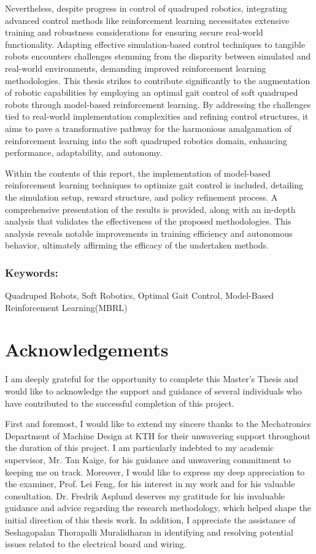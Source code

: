 Nevertheless, despite progress in control of quadruped robotics, integrating advanced control methods like reinforcement learning necessitates extensive training and robustness considerations for ensuring secure real-world functionality. Adapting effective simulation-based control techniques to tangible robots encounters challenges stemming from the disparity between simulated and real-world environments, demanding improved reinforcement learning methodologies. This thesis strikes to contribute significantly to the augmentation of robotic capabilities by employing an optimal gait control of soft quadruped robots through model-based reinforcement learning. By addressing the challenges tied to real-world implementation complexities and refining control structures, it aims to pave a transformative pathway for the harmonious amalgamation of reinforcement learning into the soft quadruped robotics domain, enhancing performance, adaptability, and autonomy.

Within the contents of this report, the implementation of model-based reinforcement learning techniques to optimize gait control is included, detailing the simulation setup, reward structure, and policy refinement process. A comprehensive presentation of the results is provided, along with an in-depth analysis that validates the effectiveness of the proposed methodologies. This analysis reveals notable improvements in training efficiency and autonomous behavior, ultimately affirming the efficacy of the undertaken methods.

\vspace{2ex}
\subsection*{Keywords:}
Quadruped Robots, Soft Robotics, Optimal Gait Control, Model-Based Reinforcement Learning(MBRL)




\newpage
\chapter*{Acknowledgements}
I am deeply grateful for the opportunity to complete this Master's Thesis and would like to acknowledge the support and guidance of several individuals who have contributed to the successful completion of this project.

First and foremost, I would like to extend my sincere thanks to the Mechatronics Department of Machine Design at KTH for their unwavering support throughout the duration of this project. I am particularly indebted to my academic supervisor, Mr. Tan Kaige, for his guidance and unwavering commitment to keeping me on track. Moreover, I would like to express my deep appreciation to the examiner, Prof. Lei Feng, for his interest in my work and for his valuable consultation. Dr. Fredrik Asplund deserves my gratitude for his invaluable guidance and advice regarding the research methodology, which helped shape the initial direction of this thesis work. In addition, I appreciate the assistance of Seshagopalan Thorapalli Muralidharan in identifying and resolving potential issues related to the electrical board and wiring. 

